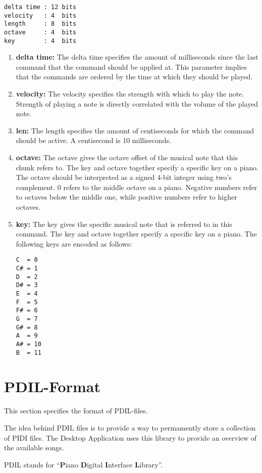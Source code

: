 \begin{verbatim}
delta time : 12 bits
velocity   : 4  bits
length     : 8  bits
octave     : 4  bits
key        : 4  bits
\end{verbatim}

\begin{enumerate}
	\item \textbf{delta time:} The delta time specifies the amount of milliseconds since the last command that the command should be applied at. This parameter implies that the commands are ordered by the time at which they should be played.
	\item \textbf{velocity:} The velocity specifies the strength with which to play the note. Strength of playing a note is directly correlated with the volume of the played note.
	\item \textbf{len:} The length specifies the amount of centiseconds for which the command should be active. A centisecond is 10 milliseconds.
	\item \textbf{octave:} The octave gives the octave offset of the musical note that this chunk refers to. The key and octave together specify a specific key on a piano. The octave should be interpreted as a signed 4-bit integer using two's complement. 0 refers to the middle octave on a piano. Negative numbers refer to octaves below the middle one, while positive numbers refer to higher octaves.
	\item \textbf{key:} The key gives the specific musical note that is referred to in this command. The key and octave together specify a specific key on a piano. The following keys are encoded as follows:
	\begin{verbatim}
C  = 0
C# = 1
D  = 2
D# = 3
E  = 4
F  = 5
F# = 6
G  = 7
G# = 8
A  = 9
A# = 10
B  = 11
	\end{verbatim}
\end{enumerate}


\section{\ac{PDIL}-Format} \label{appendix-pdil}

This section specifies the format of PDIL-files.

The idea behind PDIL files is to provide a way to permamently store a collection of PIDI files. The Desktop Application uses this library to provide an overview of the available songs.

PDIL stands for \enquote{\textbf{P}iano \textbf{D}igital \textbf{I}nterface \textbf{L}ibrary}.

